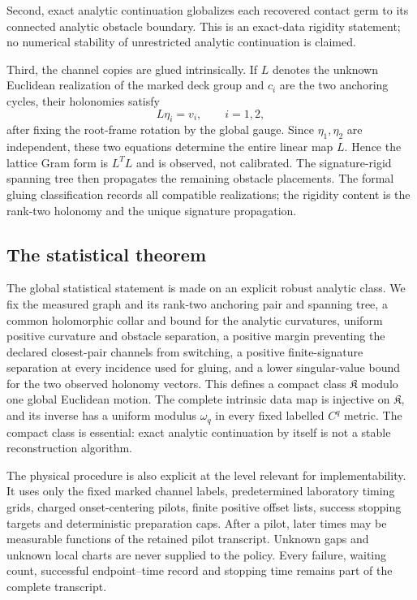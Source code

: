 Second, exact analytic continuation globalizes each recovered contact germ to
its connected analytic obstacle boundary.  This is an exact-data rigidity
statement; no numerical stability of unrestricted analytic continuation is
claimed.

Third, the channel copies are glued intrinsically.  If \(L\) denotes the
unknown Euclidean realization of the marked deck group and \(c_i\) are the
two anchoring cycles, their holonomies satisfy
\[
                         L\eta_i=v_i,
                         \qquad i=1,2,
\]
after fixing the root-frame rotation by the global gauge.  Since
\(\eta_1,\eta_2\) are independent, these two equations determine the entire
linear map \(L\).  Hence the lattice Gram form is \(L^TL\) and is observed,
not calibrated.  The signature-rigid spanning tree then propagates the
remaining obstacle placements.  The formal gluing classification records all
compatible realizations; the rigidity content is the rank-two holonomy and
the unique signature propagation.

\subsection{The statistical theorem}

The global statistical statement is made on an explicit robust analytic
class.  We fix the measured graph and its rank-two anchoring pair and spanning
tree, a common holomorphic collar and bound for the analytic curvatures,
uniform positive curvature and obstacle separation, a positive margin
preventing the declared closest-pair channels from switching, a positive
finite-signature separation at every incidence used for gluing, and a lower
singular-value bound for the two observed holonomy vectors.  This defines a
compact class \(\mathfrak K\) modulo one global Euclidean motion.  The
complete intrinsic data map is injective on \(\mathfrak K\), and its inverse
has a uniform modulus \(\omega_q\) in every fixed labelled \(C^q\) metric.
The compact class is essential: exact analytic continuation by itself is not a
stable reconstruction algorithm.

The physical procedure is also explicit at the level relevant for
implementability.  It uses only the fixed marked channel labels, predetermined
laboratory timing grids, charged onset-centering pilots, finite positive
offset lists, success stopping targets and deterministic preparation caps.
After a pilot, later times may be measurable functions of the retained pilot
transcript.  Unknown gaps and unknown local charts are never supplied to the
policy.  Every failure, waiting count, successful endpoint--time record and
stopping time remains part of the complete transcript.

